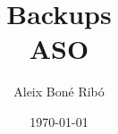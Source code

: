 



\title{Backups\\ \Large \normalfont ASO}
\author{Aleix Bon\'e Rib\'o}
\date{\today}



    \maketitle

    \setlength{\parskip}{1em plus 0.5em minus 0.2em}
    \setlength{\parindent}{0pt}


    


    


